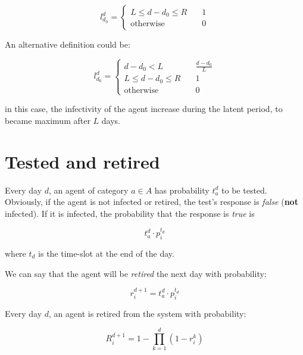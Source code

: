 \documentclass[12pt, a4paper]{article}
\begin{document}
\begin{equation}\label{eq:nextprob}
     l_{d_0}^d = \begin{cases}
            L \leq d-d_0 \leq R     &\quad{} 1 \\
            \text{otherwise} &\quad{} 0
        \end{cases}
\end{equation}

An alternative definition could be:

\begin{equation}\label{eq:nextprob}
     l_{d_0}^d = \begin{cases}
            d-d_0 < L               &\quad{} \frac{d-d_0}{L} \\
            L \leq d-d_0 \leq R     &\quad{} 1 \\
            \text{otherwise}        &\quad{} 0
        \end{cases}
\end{equation}

in this case, the infectivity of the agent increase during the latent period, to became maximum after $L$ days.



\section{Tested and retired}

Every day $d$, an agent of category $a\in A$ has probability $t_a^d$ to be tested. Obviously, if the agent is not infected or retired, the test's response is \textit{false} (\textbf{not} infected). If it is infected, the probability that the response is \textit{true} is 

\begin{equation}
     t^d_a\cdot{p_i^{t_d}}    
\end{equation}


where $t_d$ is the time-slot at the end of the day.

We can say that the agent will be \textit{retired} the next day with probability:

\begin{equation}
     r^{d+1}_i = t^d_a\cdot{p_i^{t_d}}
\end{equation}

Every day $d$, an agent is retired from the system with probability:

\begin{equation}
     R_i^{d+1} = 1 - \prod_{k=1}^{d}(1-r^k_i)
\end{equation}
\end{document}
